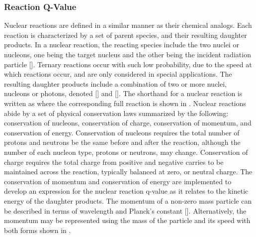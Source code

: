 \documentclass[../../../../main.tex]{subfiles}
\begin{document}
%
    \subsubsection{Reaction Q-Value}%
    \label{sec:chapter-2:radiation-detection:neutron-interactions:q-value}%
    Nuclear reactions are defined in a similar manner as their chemical analogs.
    Each reaction is characterized by a set of parent species, and their resulting daughter products.
    In a nuclear reaction, the reacting species include the two nuclei or nucleons, one being the target nucleus  and the other being the incident radiation particle [].
    Ternary reactions occur with such low probability, due to the speed at which reactions occur, and are only considered in special applications.
    The resulting daughter products include a combination of two or more nuclei, nucleons or photons, denoted [] and [].
    The shorthand for a nuclear reaction is written as  where the corresponding full reaction is shown in  \cite{book:Lamarsh_2001}.
    Nuclear reactions abide by a set of physical conservation laws summarized by the following: conservation of nucleons, conservation of charge, conservation of momentum, and conservation of energy.
    Conservation of nucleons requires the total number of protons and neutrons be the same before and after the reaction, although the number of each nucleon type, protons or neutrons, may change.
    Conservation of charge requires the total charge from positive and negative carries to be maintained across the reaction, typically balanced at zero, or neutral charge.
    The conservation of momentum and conservation of energy are implemented to develop an expression for the nuclear reaction \gls{q-value} as it relates to the kinetic energy of the daughter products. 
    The momentum of a non-zero mass particle can be described in terms of wavelength \Xvariable{\lambda} and Planck's constant [].
    Alternatively, the momentum may be represented using the mass of the particle  and its speed  with both forms shown in .
\end{document}
